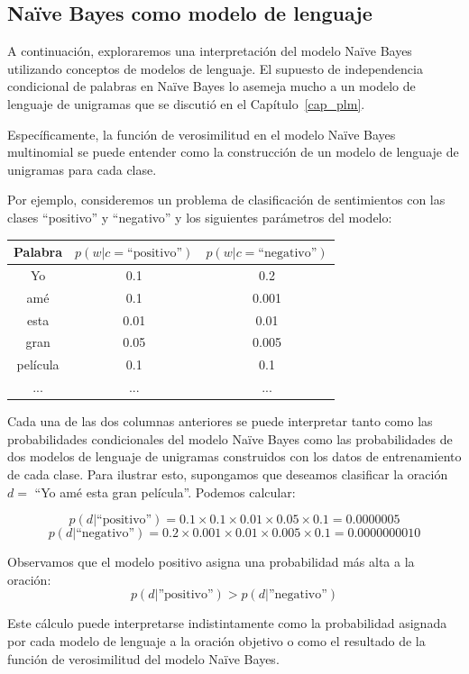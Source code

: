 \subsection{Naïve Bayes como modelo de lenguaje}

A continuación, exploraremos una interpretación del modelo Naïve Bayes utilizando conceptos de modelos de lenguaje. El supuesto de independencia condicional de palabras en Naïve Bayes lo asemeja mucho a un modelo de lenguaje de unigramas que se discutió en el Capítulo~\ref{cap_plm}.

Específicamente, la función de verosimilitud en el modelo Naïve Bayes multinomial se puede entender como la construcción de un modelo de lenguaje de unigramas para cada clase.

\begin{example}
Por ejemplo, consideremos un problema de clasificación de sentimientos con las clases ``positivo'' y ``negativo'' y los siguientes parámetros del modelo:

\begin{center}
\begin{tabular}{|ccc|} \hline
\textbf{Palabra} & $p(w|c=\text{``positivo''})$ & $p(w|c=\text{``negativo''})$  \\ \hline
Yo & 0.1 & 0.2 \\
amé & 0.1 & 0.001 \\
esta & 0.01 & 0.01 \\
gran & 0.05 & 0.005 \\
película & 0.1 & 0.1 \\
... & ... & ... \\ \hline
\end{tabular}
\end{center}

Cada una de las dos columnas anteriores se puede interpretar tanto como las probabilidades condicionales del modelo Naïve Bayes como las probabilidades de dos modelos de lenguaje de unigramas construidos con los datos de entrenamiento de cada clase. Para ilustrar esto, supongamos que deseamos clasificar la oración $d=$ ``Yo amé esta gran película''. Podemos calcular:

\[p(d|\text{``positivo''}) = 0.1 \times 0.1 \times 0.01 \times 0.05 \times 0.1 = 0.0000005\]
\[p(d|\text{``negativo''}) = 0.2 \times 0.001 \times 0.01 \times 0.005 \times 0.1 = 0.0000000010\]

Observamos que el modelo positivo asigna una probabilidad más alta a la oración:
\[p(d|\text{''positivo''}) > p(d|\text{''negativo''})\]

Este cálculo puede interpretarse indistintamente como la probabilidad asignada por cada modelo de lenguaje a la oración objetivo o como el resultado de la función de verosimilitud del modelo Naïve Bayes.
\end{example}

